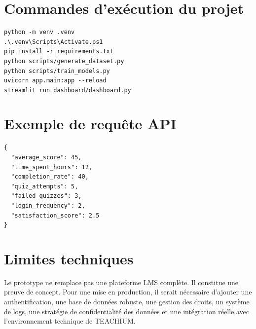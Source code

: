 \documentclass[12pt,a4paper]{report}
\begin{document}
\appendix
\chapter{Commandes d'exécution du projet}

\begin{lstlisting}[style=pythonstyle,caption={Installation et lancement du projet}]
python -m venv .venv
.\.venv\Scripts\Activate.ps1
pip install -r requirements.txt
python scripts/generate_dataset.py
python scripts/train_models.py
uvicorn app.main:app --reload
streamlit run dashboard/dashboard.py
\end{lstlisting}

\chapter{Exemple de requête API}

\begin{lstlisting}[style=pythonstyle,caption={Payload JSON pour l'analyse d'un apprenant}]
{
  "average_score": 45,
  "time_spent_hours": 12,
  "completion_rate": 40,
  "quiz_attempts": 5,
  "failed_quizzes": 3,
  "login_frequency": 2,
  "satisfaction_score": 2.5
}
\end{lstlisting}

\chapter{Limites techniques}

Le prototype ne remplace pas une plateforme LMS complète. Il constitue une preuve de concept. Pour une mise en production, il serait nécessaire d'ajouter une authentification, une base de données robuste, une gestion des droits, un système de logs, une stratégie de confidentialité des données et une intégration réelle avec l'environnement technique de TEACHIUM.
\end{document}
